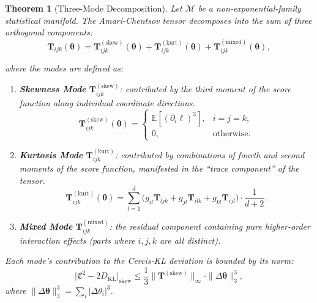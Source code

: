 \documentclass[12pt,a4paper]{article}
\theoremstyle{plain}
\newtheorem{theorem}{Theorem}
\theoremstyle{definition}
\theoremstyle{remark}
\newcommand{\E}{\mathbb{E}}
\newcommand{\Cercis}{\textsf{Cercis}}
\newcommand{\MM}{\mathcal{M}}
\newcommand{\DKL}{D_{\mathrm{KL}}}
\newcommand{\CercisScore}{\mathfrak{C}}
\newcommand{\ACT}{\mathbf{T}}    %
\begin{document}
\begin{theorem}[Three-Mode Decomposition]
\label{thm:three_modes}
Let $\MM$ be a non-exponential-family statistical manifold. The Amari-Chentsov tensor decomposes into the sum of three orthogonal components:
\begin{equation}\label{eq:mode_decomp}
    \ACT_{ijk}(\bm{\theta}) = \ACT^{(\mathrm{skew})}_{ijk}(\bm{\theta})
                           + \ACT^{(\mathrm{kurt})}_{ijk}(\bm{\theta})
                           + \ACT^{(\mathrm{mixed})}_{ijk}(\bm{\theta}),
\end{equation}

where the modes are defined as:

\begin{enumerate}[label=\textbf{Mode \arabic*}:, leftmargin=*]
    \item \textbf{Skewness Mode} $\ACT^{(\mathrm{skew})}_{ijk}$: contributed by the third moment of the score function along individual coordinate directions.
    \begin{equation}\label{eq:skew_mode}
        \ACT^{(\mathrm{skew})}_{ijk}(\bm{\theta}) =
        \begin{cases}
            \E[(\partial_i \ell)^3], & i = j = k, \\
            0, & \text{otherwise}.
        \end{cases}
    \end{equation}

    \item \textbf{Kurtosis Mode} $\ACT^{(\mathrm{kurt})}_{ijk}$: contributed by combinations of fourth and second moments of the score function, manifested in the ``trace component'' of the tensor.
    \begin{equation}\label{eq:kurt_mode}
        \ACT^{(\mathrm{kurt})}_{ijk}(\bm{\theta}) =
        \sum_{l=1}^d \bigl(g_{il}\ACT_{ljk} + g_{jl}\ACT_{ilk} + g_{kl}\ACT_{ijl}\bigr) \cdot \frac{1}{d+2}.
    \end{equation}

    \item \textbf{Mixed Mode} $\ACT^{(\mathrm{mixed})}_{ijk}$: the residual component containing pure higher-order interaction effects (parts where $i, j, k$ are all distinct).
\end{enumerate}

Each mode's contribution to the \Cercis-KL deviation is bounded by its norm:
\begin{equation}\label{eq:mode_bounds}
    \bigl|\CercisScore^2 - 2\DKL\bigr|_{\mathrm{skew}}
    \leq \frac{1}{3} \|\ACT^{(\mathrm{skew})}\|_{\infty} \cdot \|\Delta\bm{\theta}\|_3^3,
\end{equation}
where $\|\Delta\bm{\theta}\|_3^3 = \sum_i |\Delta\theta_i|^3$.
\end{theorem}
\end{document}
